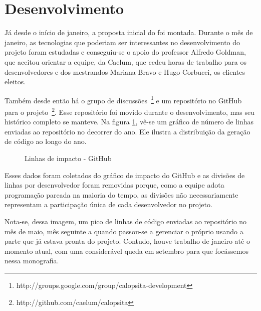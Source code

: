 \section{Desenvolvimento}

Já desde o início de janeiro, a proposta inicial do \calopsita{} foi montada. Durante o mês de janeiro, as tecnologias que poderiam ser interessantes no desenvolvimento do projeto foram estudadas e conseguiu-se o apoio do professor Alfredo Goldman, que aceitou orientar a equipe, da Caelum, que cedeu horas de trabalho para os desenvolvedores e dos mestrandos Mariana Bravo e Hugo Corbucci, os clientes eleitos.

Também desde então há o grupo de discussões~\footnote{http://groups.google.com/group/calopsita-development} e um repositório no GitHub para o projeto~\footnote{http://github.com/caelum/calopsita}. Esse repositório foi movido durante o desenvolvimento, mas seu histórico completo se manteve. Na figura \ref{figura:github}, vê-se um gráfico de número de linhas enviadas ao repositório no decorrer do ano. Ele ilustra a distribuição da geração de código ao longo do ano.

\begin{figure}[H]
  \centering
  \caption{Linhas de impacto - GitHub}\label{figura:github}
\end{figure}

Esses dados foram coletados do gráfico de impacto do GitHub e as divisões de linhas por desenvolvedor foram removidas porque, como a equipe adota programação pareada na maioria do tempo, as divisões não necessariamente representam a participação única de cada desenvolvedor no projeto.

Nota-se, dessa imagem, um pico de linhas de código enviadas ao repositório no mês de maio, mês seguinte a quando passou-se a gerenciar o próprio \calopsita{} usando a parte que já estava pronta do projeto. Contudo, houve trabalho de janeiro até o momento atual, com uma considerável queda em setembro para que focássemos nessa monografia.

